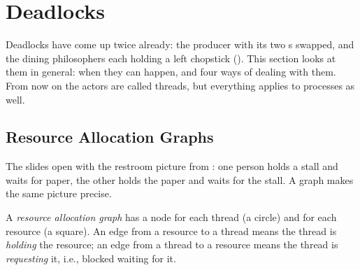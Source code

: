 \section{Deadlocks}
\label{sec:deadlock}

Deadlocks have come up twice already: the producer with its two s swapped, and the dining philosophers each holding a left chopstick (). This section looks at them in general: when they can happen, and four ways of dealing with them. From now on the actors are called threads, but everything applies to processes as well.

\subsection{Resource Allocation Graphs}

The slides open with the restroom picture from : one person holds a stall and waits for paper, the other holds the paper and waits for the stall. A graph makes the same picture precise.

\begin{definition}
  A \emph{resource allocation graph} has a node for each thread (a circle) and for each resource (a square). An edge from a resource to a thread means the thread is \emph{holding} the resource; an edge from a thread to a resource means the thread is \emph{requesting} it, i.e., blocked waiting for it.
\end{definition}

